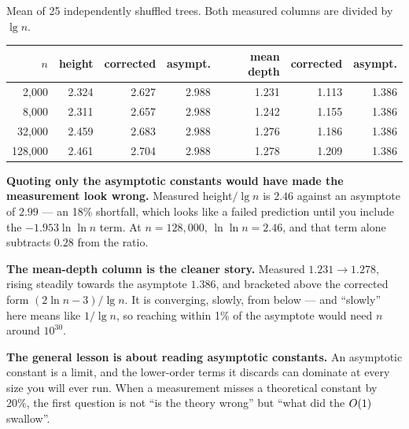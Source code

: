 \begin{worked}
Mean of 25 independently shuffled trees. Both measured columns are divided by
$\lg n$.

\begin{center}
\begin{tabular}{@{}rrrrrrr@{}}
\toprule
\rowcolor{primary!15}
$n$ & height & corrected & asympt. & mean depth & corrected & asympt. \\
\midrule
  2{,}000 & 2.324 & 2.627 & 2.988 & 1.231 & 1.113 & 1.386 \\
  8{,}000 & 2.311 & 2.657 & 2.988 & 1.242 & 1.155 & 1.386 \\
 32{,}000 & 2.459 & 2.683 & 2.988 & 1.276 & 1.186 & 1.386 \\
128{,}000 & 2.461 & 2.704 & 2.988 & 1.278 & 1.209 & 1.386 \\
\bottomrule
\end{tabular}
\end{center}

\smallskip
\textbf{Quoting only the asymptotic constants would have made the measurement
look wrong.} Measured height$/\lg n$ is $2.46$ against an asymptote of $2.99$
--- an 18\% shortfall, which looks like a failed prediction until you include
the $-1.953\ln\ln n$ term. At $n = 128{,}000$, $\ln\ln n = 2.46$, and that term
alone subtracts $0.28$ from the ratio.

\smallskip
\textbf{The mean-depth column is the cleaner story.} Measured $1.231 \to 1.278$,
rising steadily towards the asymptote $1.386$, and bracketed above the
corrected form $(2\ln n - 3)/\lg n$. It is converging, slowly, from below ---
and ``slowly'' here means like $1/\lg n$, so reaching within 1\% of the
asymptote would need $n$ around $10^{30}$.

\smallskip
\textbf{The general lesson is about reading asymptotic constants.} An
asymptotic constant is a limit, and the lower-order terms it discards can
dominate at every size you will ever run. When a measurement misses a
theoretical constant by 20\%, the first question is not ``is the theory wrong''
but ``what did the $O(1)$ swallow''.
\end{worked}

